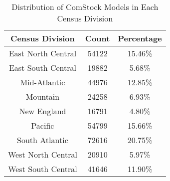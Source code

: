 \begin{table}[h!]
\centering
\small
\caption[Distribution of ComStock Models in Each Census Division]{Distribution of ComStock Models in Each Census Division}
\label{tab:census_division_models_table}
\begin{tabular}{|c|c|c|}
\hline
\textbf{Census Division}                                & \textbf{Count}              & \textbf{Percentage}                                     \\ \hline
East North Central                                         & 54122                 & 15.46\%      \\ \hline
East South Central                                         & 19882                 & 5.68\%      \\ \hline
Mid-Atlantic                                         & 44976                & 12.85\%      \\ \hline
Mountain                                         & 24258                & 6.93\%      \\ \hline
New England                                         & 16791                & 4.80\%      \\ \hline
Pacific                                         & 54799                & 15.66\%      \\ \hline
South Atlantic                                         & 72616                & 20.75\%      \\ \hline
West North Central                                         & 20910                & 5.97\%      \\ \hline
West South Central                                         & 41646                & 11.90\%      \\ 
\hline
\end{tabular}
\end{table}